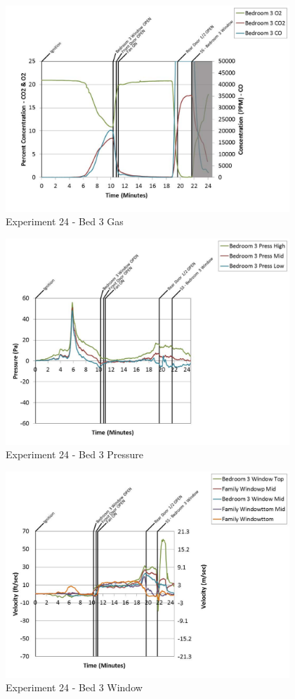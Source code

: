 \documentclass{article}
\begin{document}
\begin{appendices}
	\clearpage

	\begin{figure}[h!]
		\centering
		\includegraphics[height=3.05in]{0_Images/Results_Charts/Exp_24_Charts/Bed3Gas.pdf}
		\caption{Experiment 24 - Bed 3 Gas}
	\end{figure}
 

	\begin{figure}[h!]
		\centering
		\includegraphics[height=3.05in]{0_Images/Results_Charts/Exp_24_Charts/Bed3Pressure.pdf}
		\caption{Experiment 24 - Bed 3 Pressure}
	\end{figure}
 
	\clearpage

	\begin{figure}[h!]
		\centering
		\includegraphics[height=3.05in]{0_Images/Results_Charts/Exp_24_Charts/Bed3Window.pdf}
		\caption{Experiment 24 - Bed 3 Window}
	\end{figure}
 


\end{appendices}
\end{document}
